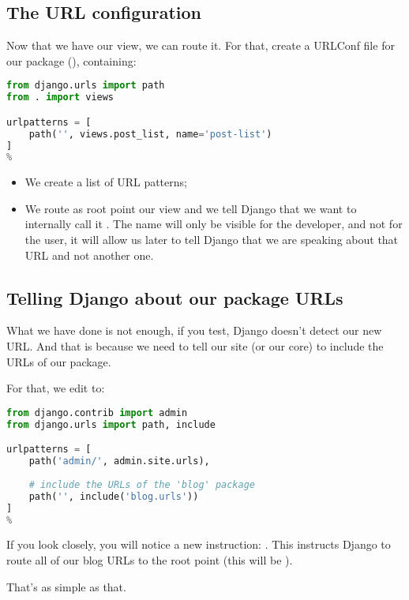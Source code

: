\subsection{The URL configuration}
    Now that we have our view, we can route it. 
    For that, create a URLConf file for our  package (), containing:
    
    \begin{lstlisting}[language=python, title=blog/urls.py]
from django.urls import path
from . import views

urlpatterns = [
    path('', views.post_list, name='post-list')
]
%
    \end{lstlisting}

    \begin{itemize}
        \item We create a list of URL patterns;
        \item We route as root point our  view 
            and we tell Django that we want to internally call it .
            The name will only be visible for the developer, and not for the user,
            it will allow us later to tell Django that we are speaking about that URL and not another one.
    \end{itemize}

    \subsection{Telling Django about our package URLs}
        What we have done is not enough, if you test, Django doesn't detect our new URL.
        And that is because we need to tell our site (or our core) to include the URLs of our  package.
        
        For that, we edit  to:
        
        \begin{lstlisting}[language=python, title=mysite/urls.py]
from django.contrib import admin
from django.urls import path, include

urlpatterns = [
    path('admin/', admin.site.urls),
    
    # include the URLs of the 'blog' package
    path('', include('blog.urls'))
]
%
        \end{lstlisting}

        If you look closely, you will notice a new instruction:
        . 
        This instructs Django to route all of our blog URLs to the root point
        (this will be ).
        
        That's as simple as that.
